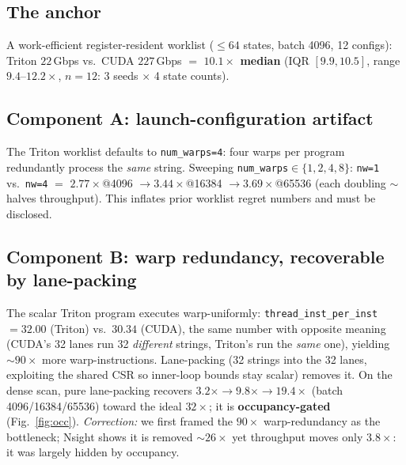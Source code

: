 \documentclass[sigplan,10pt]{acmart}
\begin{document}
\subsection{The anchor}
A work-efficient register-resident worklist ($\le 64$ states, batch 4096, 12 configs): Triton
$22$\,Gbps vs.\ CUDA $227$\,Gbps $=$ \textbf{$10.1\times$ median} (IQR $[9.9, 10.5]$, range $9.4$--$12.2\times$, $n{=}12$: 3 seeds $\times$ 4 state counts).

\subsection{Component A: launch-configuration artifact}\label{sec:artifact}
The Triton worklist defaults to \texttt{num\_warps=4}: four warps per program redundantly process the
\emph{same} string. Sweeping \texttt{num\_warps}$\in\{1,2,4,8\}$: \texttt{nw=1} vs.\ \texttt{nw=4} $=$
$2.77\times$@4096 $\rightarrow 3.44\times$@16384 $\rightarrow 3.69\times$@65536 (each doubling
${\sim}$halves throughput). This inflates prior worklist regret numbers and must be disclosed.

\subsection{Component B: warp redundancy, recoverable by lane-packing}
The scalar Triton program executes warp-uniformly: \texttt{thread\_inst\_per\_inst} $=32.00$ (Triton)
vs.\ $30.34$ (CUDA), the same number with opposite meaning (CUDA's 32 lanes run 32 \emph{different}
strings, Triton's run the \emph{same} one), yielding ${\sim}90\times$ more warp-instructions. Lane-packing
(32 strings into the 32 lanes, exploiting the shared CSR so inner-loop bounds stay scalar) removes it.
On the dense scan, pure lane-packing recovers $3.2\times \rightarrow 9.8\times \rightarrow 19.4\times$
(batch 4096/16384/65536) toward the ideal $32\times$; it is \textbf{occupancy-gated}
(Fig.~\ref{fig:occ}). \emph{Correction:} we first framed the $90\times$ warp-redundancy as the
bottleneck; Nsight shows it is removed ${\sim}26\times$ yet throughput moves only $3.8\times$: it was
largely hidden by occupancy.
\end{document}
